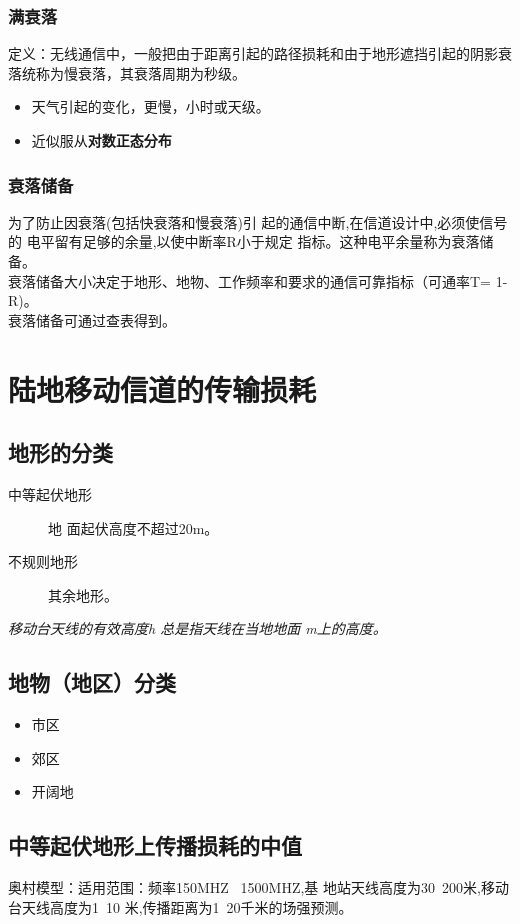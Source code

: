 \subsubsection{满衰落}
定义：无线通信中，一般把由于距离引起的路径损耗和由于地形遮挡引起的阴影衰落统称为慢衰落，其衰落周期为秒级。
\begin{itemize}
	\item 天气引起的变化，更慢，小时或天级。
	\item 近似服从\textbf{对数正态分布}
\end{itemize}
\subsubsection{衰落储备}
 为了防止因衰落(包括快衰落和慢衰落)引
起的通信中断,在信道设计中,必须使信号的
电平留有足够的余量,以使中断率R小于规定
指标。这种电平余量称为衰落储备。\\
衰落储备大小决定于地形、地物、工作频率和要求的通信可靠指标（可通率T= 1-R)。\\
衰落储备可通过查表得到。

\section{陆地移动信道的传输损耗
}
\subsection{地形的分类
}
\begin{description}
	\item[中等起伏地形]地
	面起伏高度不超过20m。
	\item[不规则地形] 其余地形。
\end{description}
\textit{移动台天线的有效高度h 总是指天线在当地地面
	m上的高度。
}
\subsection{地物（地区）分类}
\begin{itemize}
	\item 市区
	\item 郊区
	\item 开阔地
\end{itemize}
\subsection{中等起伏地形上传播损耗的中值
}
奥村模型：适用范围：频率150MHZ ~1500MHZ,基
地站天线高度为30~200米,移动台天线高度为1~10
米,传播距离为1~20千米的场强预测。\\

